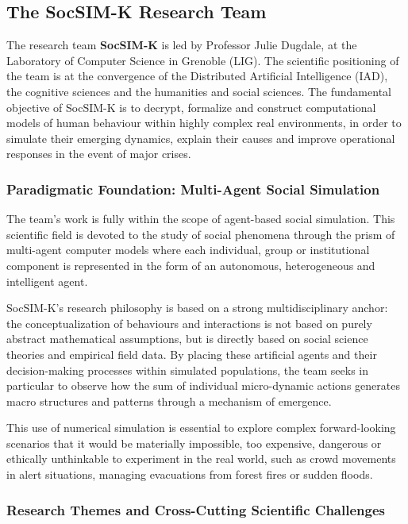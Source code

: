 \documentclass{article}
\begin{document}
\subsection{The SocSIM-K Research Team}

The research team \textbf{SocSIM-K} is led by Professor Julie Dugdale, at the Laboratory of Computer Science in Grenoble (LIG). The scientific positioning of the team is at the convergence of the Distributed Artificial Intelligence (IAD), the cognitive sciences and the humanities and social sciences. The fundamental objective of SocSIM-K is to decrypt, formalize and construct computational models of human behaviour within highly complex real environments, in order to simulate their emerging dynamics, explain their causes and improve operational responses in the event of major crises.

\subsubsection{Paradigmatic Foundation: Multi-Agent Social Simulation}

The team's work is fully within the scope of agent-based social simulation. This scientific field is devoted to the study of social phenomena through the prism of multi-agent computer models where each individual, group or institutional component is represented in the form of an autonomous, heterogeneous and intelligent agent.

SocSIM-K's research philosophy is based on a strong multidisciplinary anchor: the conceptualization of behaviours and interactions is not based on purely abstract mathematical assumptions, but is directly based on social science theories and empirical field data. By placing these artificial agents and their decision-making processes within simulated populations, the team seeks in particular to observe how the sum of individual micro-dynamic actions generates macro structures and patterns through a mechanism of emergence.

This use of numerical simulation is essential to explore complex forward-looking scenarios that it would be materially impossible, too expensive, dangerous or ethically unthinkable to experiment in the real world, such as crowd movements in alert situations, managing evacuations from forest fires or sudden floods.

\subsubsection{Research Themes and Cross-Cutting Scientific Challenges}
\end{document}
